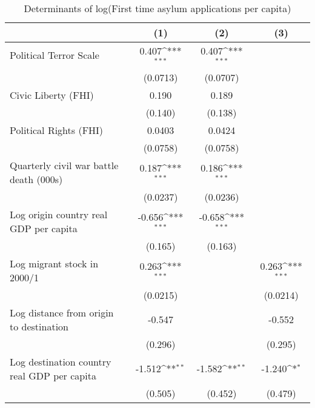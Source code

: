 \begin{table}[htbp]\centering
\def\sym#1{\ifmmode^{#1}\else\(^{#1}\)\fi}
\caption{Determinants of log(First time asylum applications per capita)}
\begin{tabular}{l*{3}{c}}
\hline\hline
                    &\multicolumn{1}{c}{(1)}         &\multicolumn{1}{c}{(2)}         &\multicolumn{1}{c}{(3)}         \\
\hline
Political Terror Scale&       0.407\sym{***}&       0.407\sym{***}&                     \\
                    &    (0.0713)         &    (0.0707)         &                     \\
[1em]
Civic Liberty (FHI) &       0.190         &       0.189         &                     \\
                    &     (0.140)         &     (0.138)         &                     \\
[1em]
Political Rights (FHI)&      0.0403         &      0.0424         &                     \\
                    &    (0.0758)         &    (0.0758)         &                     \\
[1em]
Quarterly civil war battle death (000s)&       0.187\sym{***}&       0.186\sym{***}&                     \\
                    &    (0.0237)         &    (0.0236)         &                     \\
[1em]
Log origin country real GDP per capita&      -0.656\sym{***}&      -0.658\sym{***}&                     \\
                    &     (0.165)         &     (0.163)         &                     \\
[1em]
Log migrant stock in 2000/1&       0.263\sym{***}&                     &       0.263\sym{***}\\
                    &    (0.0215)         &                     &    (0.0214)         \\
[1em]
Log distance from origin to destination&      -0.547         &                     &      -0.552         \\
                    &     (0.296)         &                     &     (0.295)         \\
[1em]
Log destination country real GDP per capita&      -1.512\sym{**} &      -1.582\sym{**} &      -1.240\sym{*}  \\
                    &     (0.505)         &     (0.452)         &     (0.479)         \\

\end{tabular}
\end{table}
